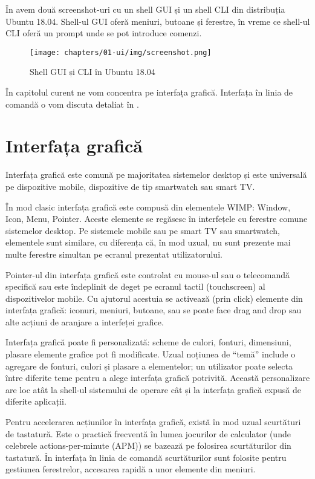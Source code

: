 În  avem două screenshot-uri cu un shell GUI și un shell CLI din distribuția Ubuntu 18.04. Shell-ul GUI oferă meniuri, butoane și ferestre, în vreme ce shell-ul CLI oferă un prompt unde se pot introduce comenzi.

\begin{figure}[!htbp]
  \centering
  \texttt{[image: chapters/01-ui/img/screenshot.png]}
  \caption{Shell GUI și CLI în Ubuntu 18.04}
  \label{fig:ui:shell-gui-cli}
\end{figure}

În capitolul curent ne vom concentra pe interfața grafică. Interfața în linia de comandă o vom discuta detaliat în .

\section{Interfața grafică}
\label{sec:ui:gui}

Interfața grafică este comună pe majoritatea sistemelor desktop și este universală pe dispozitive mobile, dispozitive de tip smartwatch sau smart TV.

În mod clasic interfața grafică este compusă din elementele WIMP: Window, Icon, Menu, Pointer. Aceste elemente se regăsesc în interfețele cu ferestre comune sistemelor desktop. Pe sistemele mobile sau pe smart TV sau smartwatch, elementele sunt similare, cu diferența că, în mod uzual, nu sunt prezente mai multe ferestre simultan pe ecranul prezentat utilizatorului.

Pointer-ul din interfața grafică este controlat cu mouse-ul sau o telecomandă specifică sau este îndeplinit de deget pe ecranul tactil (touchscreen) al dispozitivelor mobile. Cu ajutorul acestuia se activează (prin click) elemente din interfața grafică: iconuri, meniuri, butoane, sau se poate face drag and drop sau alte acțiuni de aranjare a interfeței grafice.

Interfața grafică poate fi personalizată: scheme de culori, fonturi, dimensiuni, plasare elemente grafice pot fi modificate. Uzual noțiunea de “temă” include o agregare de fonturi, culori și plasare a elementelor; un utilizator poate selecta între diferite teme pentru a alege interfața grafică potrivită. Această personalizare are loc atât la shell-ul sistemului de operare cât și la interfața grafică expusă de diferite aplicații.

Pentru accelerarea acțiunilor în interfața grafică, există în mod uzual scurtături de tastatură. Este o practică frecventă în lumea jocurilor de calculator (unde celebrele actions-per-minute (APM)) se bazează pe folosirea scurtăturilor din tastatură. În interfața în linia de comandă scurtăturilor sunt folosite pentru gestiunea ferestrelor, accesarea rapidă a unor elemente din meniuri.


